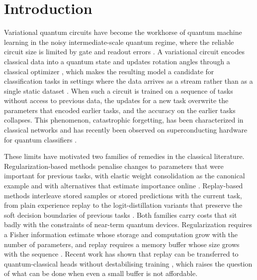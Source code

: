 \documentclass[preprint,number,sort&compress]{elsarticle}
\begin{document}
\section{Introduction}

Variational quantum circuits have become the workhorse of quantum machine
learning in the noisy intermediate-scale quantum regime, where the reliable
circuit size is limited by gate and readout errors \cite{Preskill18,
cerezo2021variational}. A variational circuit encodes classical data into a
quantum state and updates rotation angles through a classical optimizer
\cite{Mitarai18, biamonte2017quantum}, which makes the resulting
model a candidate for classification tasks in settings where the data
arrives as a stream rather than as a single static dataset
\cite{RODRIGUEZ-DIAZ26}. When such a circuit is trained on a sequence of
tasks without access to previous data, the updates for a new task overwrite
the parameters that encoded earlier tasks, and the accuracy on the earlier
tasks collapses. This phenomenon, catastrophic forgetting, has been
characterized in classical networks \cite{McCloskey89,
parisi2019continual} and has recently been observed on superconducting
hardware for quantum classifiers \cite{Zhang26}.

These limits have motivated two families of remedies in the classical
literature. Regularization-based methods penalise changes to parameters that
were important for previous tasks, with elastic weight consolidation as the
canonical example \cite{kirkpatrick2017overcoming} and with alternatives
that estimate importance online \cite{Zenke17}. Replay-based
methods interleave stored samples or stored predictions with the current
task, from plain experience replay \cite{lopezpaz2017gem} to the
logit-distillation variants that preserve the soft decision boundaries of
previous tasks \cite{buzzega2020dark}. Both families carry costs that sit
badly with the constraints of near-term quantum devices. Regularization
requires a Fisher information estimate whose storage and computation grow
with the number of parameters, and replay requires a memory buffer whose
size grows with the sequence \cite{mcclean2018barren, Wang21}. Recent
work has shown that replay can be transferred to quantum-classical heads
without destabilising training \cite{martinperez2026derpp}, which raises the
question of what can be done when even a small buffer is not affordable.
\end{document}
